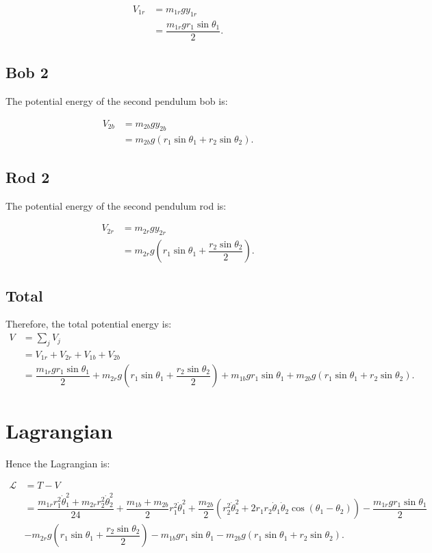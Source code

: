 \documentclass[12pt,a4paper,portrait]{article}
\begin{document}
	\begin{align*}
		V_{1r} &= m_{1r} gy_{1r} \\
		&= \dfrac{m_{1r}gr_1 \sin{\theta_1}}{2}.
	\end{align*}
	
	\subsection{Bob 2}
	The potential energy of the second pendulum bob is:
	
	\begin{align*}
		V_{2b} &= m_{2b} gy_{2b} \\
		&= m_{2b} g \left(r_1 \sin{\theta_1} + r_2 \sin{\theta_2}\right).
	\end{align*}
	
	\subsection{Rod 2}
	The potential energy of the second pendulum rod is:
	
	\begin{align*}
		V_{2r} &= m_{2r} gy_{2r} \\
		 &= m_{2r}g \left(r_1 \sin{\theta_1} + \dfrac{r_2\sin{\theta_2}}{2}\right).
	\end{align*}
	
	\subsection{Total}
	Therefore, the total potential energy is:
	\begin{align*}
		V &= \sum_j V_j \\
		&= V_{1r} + V_{2r} + V_{1b} + V_{2b} \\
		&= \dfrac{m_{1r}gr_1 \sin{\theta_1}}{2} + m_{2r}g \left(r_1 \sin{\theta_1} + \dfrac{r_2\sin{\theta_2}}{2}\right) + m_{1b}gr_1 \sin{\theta_1} + m_{2b} g \left(r_1 \sin{\theta_1} + r_2 \sin{\theta_2}\right).
	\end{align*}
	
	\section{Lagrangian}
	Hence the Lagrangian is:
	
	\begin{align*}
		\mathcal{L} &= T - V \\
		&= \dfrac{m_{1r} r_1^2 \dot{\theta}_1^2 + m_{2r}r_2^2 \dot{\theta}_2^2}{24} + \dfrac{m_{1b}+m_{2b}}{2}r_1^2 \dot{\theta}_1^2 + \dfrac{m_{2b}}{2} \left(r_2^2\dot{\theta}_2^2 + 2r_1 r_2 \dot{\theta}_1 \dot{\theta}_2 \cos{\left(\theta_1 - \theta_2\right)}\right) - \dfrac{m_{1r}gr_1 \sin{\theta_1}}{2} \\
		&-m_{2r}g \left(r_1 \sin{\theta_1} + \dfrac{r_2\sin{\theta_2}}{2}\right) - m_{1b}gr_1 \sin{\theta_1} - m_{2b} g \left(r_1 \sin{\theta_1} + r_2 \sin{\theta_2}\right).
	\end{align*}
	
\end{document}
